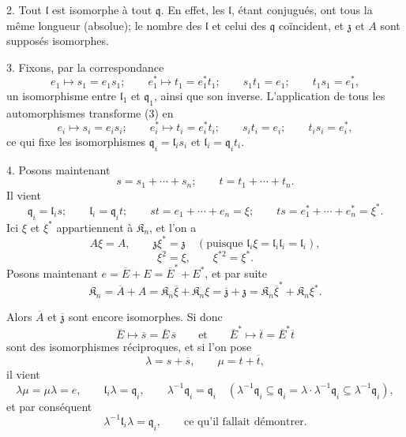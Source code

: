 2. Tout \(\mathfrak l\) est isomorphe à tout \(\mathfrak q\). En effet, les \(\mathfrak l\), étant conjugués, ont tous la même longueur (absolue); le nombre des \(\mathfrak l\) et celui des \(\mathfrak q\) coïncident, et \(\mathfrak z\) et \(A\) sont supposés isomorphes.

3. Fixons, par la correspondance
\[
\tag{3}
e_1\mapsto s_1=e_1s_1;\qquad
e_1^*\mapsto t_1=e_1^*t_1;\qquad
s_1t_1=e_1;\qquad
t_1s_1=e_1^*,
\]
un isomorphisme entre \(\mathfrak l_1\) et \(\mathfrak q_1\), ainsi que son inverse. L'application de tous les automorphismes transforme (3) en
\[
e_i\mapsto s_i=e_is_i;\qquad
e_i^*\mapsto t_i=e_i^*t_i;\qquad
s_it_i=e_i;\qquad
t_is_i=e_i^*,
\]
ce qui fixe les isomorphismes \(\mathfrak q_i=\mathfrak l_is_i\) et \(\mathfrak l_i=\mathfrak q_it_i\).

4. Posons maintenant
\[
s=s_1+\cdots+s_n;\qquad t=t_1+\cdots+t_n.
\]
Il vient
\[
\mathfrak q_i=\mathfrak l_is;\qquad
\mathfrak l_i=\mathfrak q_it;\qquad
st=e_1+\cdots+e_n=\xi;\qquad
ts=e_1^*+\cdots+e_n^*=\xi^*.
\]
Ici \(\xi\) et \(\xi^*\) appartiennent à \(\mathfrak K_n\), et l'on a
\[
A\xi=A,\qquad \mathfrak z\xi^*=\mathfrak z\quad
(\text{puisque }\mathfrak l_i\xi=\mathfrak l_i\mathfrak l_i=\mathfrak l_i),
\]
\[
\xi^2=\xi,\qquad \xi^{*2}=\xi^*.
\]
Posons maintenant \(e=\overline E+E=\overline E^*+E^*\), et par suite
\[
\mathfrak K_n=\overline A+A
=\mathfrak K_n\overline\xi+\mathfrak K_n\xi
=\overline{\mathfrak z}+\mathfrak z
=\mathfrak K_n\overline\xi^*+\mathfrak K_n\xi^*.
\]

Alors \(\overline A\) et \(\overline{\mathfrak z}\) sont encore isomorphes. Si donc
\[
\overline E\mapsto\overline s=\overline E\,\overline s
\qquad\text{et}\qquad
\overline E^*\mapsto\overline t=\overline E^*\overline t
\]
sont des isomorphismes réciproques, et si l'on pose
\[
\lambda=s+\overline s,\qquad \mu=t+\overline t,
\]
il vient
\[
\lambda\mu=\mu\lambda=e,\qquad
\mathfrak l_i\lambda=\mathfrak q_i,\qquad
\lambda^{-1}\mathfrak q_i=\mathfrak q_i
\quad
(\lambda^{-1}\mathfrak q_i\subseteq\mathfrak q_i
=\lambda\cdot\lambda^{-1}\mathfrak q_i\subseteq\lambda^{-1}\mathfrak q_i),
\]
et par conséquent
\[
\lambda^{-1}\mathfrak l_i\lambda=\mathfrak q_i,
\qquad\text{ce qu'il fallait démontrer.}
\]

